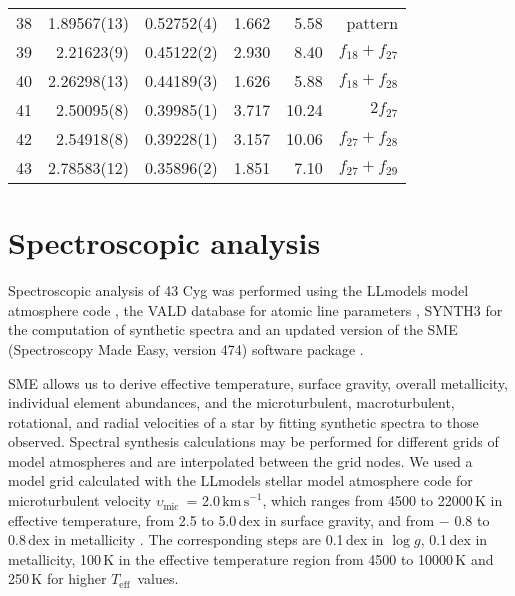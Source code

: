 \documentclass{aa}
\def\Teff{\ensuremath{T_{\mathrm{eff}}}}
\def\logg{\ensuremath{\log g}}
\def\vmic{$\upsilon_{\mathrm{mic}}$}
\def\kms{$\mathrm{km\,s}^{-1}$}
\begin{document}
\begin{table*}
\begin{center}
\begin{tabular}{rrrrrr}
38	&	1.89567(13)	&	0.52752(4)	&	1.662	&	5.58	&	pattern	\\
39	&	2.21623(9)	&	0.45122(2)	&	2.930	&	8.40	&	$f_{18}+f_{27}$	\\
40	&	2.26298(13)	&	0.44189(3)	&	1.626	&	5.88	&	$f_{18}+f_{28}$	\\
41	&	2.50095(8)	&	0.39985(1)	&	3.717	&	10.24	&	$2f_{27}$	\\
42	&	2.54918(8)	&	0.39228(1)	&	3.157	&	10.06	&	$f_{27}+f_{28}$	\\
43	&	2.78583(12)	&	0.35896(2)	&	1.851	&	7.10	&	$f_{27}+f_{29}$	\\
\hline
\end{tabular}
\end{center}
\end{table*}





\section{Spectroscopic analysis}

Spectroscopic analysis of 43 Cyg was performed using the {\sc LLmodels} model atmosphere code \citep{shulyak2004}, the VALD database for atomic line parameters \citep{kupka1999}, SYNTH3 \citep{kochukhov2007} for the computation of synthetic spectra and an updated version of the SME (Spectroscopy Made Easy, version 474) software package \citep{valenti1996,piskunov2017}.

SME allows us to derive effective temperature, surface gravity, overall metallicity, individual element abundances, and the microturbulent, macroturbulent, rotational, and radial velocities of a star by fitting synthetic spectra to those observed. Spectral synthesis calculations may be performed for different grids of model atmospheres and are interpolated between the grid nodes. We used a model grid calculated with the {\sc LLmodels} stellar model atmosphere code for microturbulent velocity \vmic\ = 2.0\,\kms, which ranges from 4500 to 22000\,K in effective temperature, from 
2.5 to 5.0\,dex in surface gravity, and from 
$-$ 0.8 to 0.8\,dex in metallicity \citep[see Table 5 of][]{tkachenko2012}. The corresponding steps are 0.1\,dex in \logg, 0.1\,dex in metallicity, 100\,K in the effective temperature region from 
4500 to 10000\,K and 250\,K for higher \Teff\ values.
\end{document}
